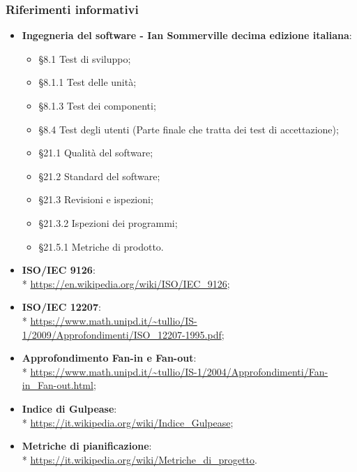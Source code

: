 \subsubsection{Riferimenti informativi}
\begin{itemize}
\item \textbf{Ingegneria del software - Ian Sommerville decima edizione italiana}:
	\begin{itemize}	
		\item §8.1 Test di sviluppo;
		\item §8.1.1 Test delle unità;
		\item §8.1.3 Test dei componenti;
		\item §8.4 Test degli utenti (Parte finale che tratta dei test di accettazione);
		\item §21.1 Qualità del software;
		\item §21.2 Standard del software;
		\item §21.3 Revisioni e ispezioni;
		\item §21.3.2 Ispezioni dei programmi;
		\item §21.5.1 Metriche di prodotto.
	\end{itemize}
\item \textbf{ISO/IEC 9126}: \\* \url{https://en.wikipedia.org/wiki/ISO/IEC_9126};
\item \textbf{ISO/IEC 12207}: \\* 
\url{https://www.math.unipd.it/~tullio/IS-1/2009/Approfondimenti/ISO\_12207-1995.pdf};
\item \textbf{Approfondimento Fan-in e Fan-out}: \\*
\url{https://www.math.unipd.it/~tullio/IS-1/2004/Approfondimenti/Fan-in_Fan-out.html};
\item \textbf{Indice di Gulpease}: \\* \url{https://it.wikipedia.org/wiki/Indice_Gulpease};
\item \textbf{Metriche di pianificazione}: \\* \url{https://it.wikipedia.org/wiki/Metriche_di_progetto}.
\end{itemize}